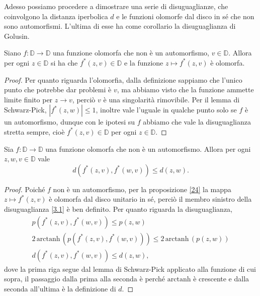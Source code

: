 Adesso possiamo procedere a dimostrare una serie di disuguaglianze, che coinvolgono la distanza iperbolica $d$ e le funzioni olomorfe dal disco in sé che non sono automorfismi. L'ultima di esse ha come corollario la disuguaglianza di Golusin.

\begin{prop} \label{24}
  Siano $f:\mathbb{D} \longrightarrow \mathbb{D}$ una funzione olomorfa che non è un automorfismo, $v \in \mathbb{D}$. Allora per ogni $z \in \mathbb{D}$ si ha che $f^*(z,v) \in \mathbb{D}$ e la funzione $z \longmapsto f^*(z,v)$ è olomorfa.
\end{prop}

\begin{proof}
  Per quanto riguarda l'olomorfia, dalla definizione sappiamo che l'unico punto che potrebbe dar problemi è $v$, ma abbiamo visto che la funzione ammette limite finito per $z \longrightarrow v$, perciò $v$ è una singolarità rimovibile. Per il lemma di Schwarz-Pick, $|f^*(z,w)| \le 1$, inoltre vale l'uguale in qualche punto solo se $f$ è un automorfismo, dunque con le ipotesi su $f$ abbiamo che vale la disuguaglianza stretta sempre, cioè $f^*(z,v) \in \mathbb{D}$ per ogni $z \in \mathbb{D}$.
\end{proof}

\begin{thm} \label{31}
  Sia $f:\mathbb{D} \longrightarrow \mathbb{D}$ una funzione olomorfa che non è un automorfismo. Allora per ogni $z, w, v \in \mathbb{D}$ vale
  \begin{equation} \label{3.1}
    d(f^*(z,v),f^*(w,v)) \le d(z,w).
  \end{equation}
\end{thm}

\begin{proof}
  Poiché $f$ non è un automorfismo, per la proposizione \ref{24} la mappa $z \longmapsto f^*(z,v)$ è olomorfa dal disco unitario in sé, perciò il membro sinistro della disuguaglianza \eqref{3.1} è ben definito. Per quanto riguarda la disuguaglianza,
  \begin{align*}
    p(f^*(z,v), f^*(w,v)) \le p(z,w) \\
    2\,\text{arctanh}\,(p(f^*(z,v), f^*(w,v))) \le 2\,\text{arctanh}\,(p(z,w)) \\
    d(f^*(z,v), f^*(w,v)) \le d(z,w),
  \end{align*}
  dove la prima riga segue dal lemma di Schwarz-Pick applicato alla funzione di cui sopra, il passaggio dalla prima alla seconda è perché $\text{arctanh}$ è crescente e dalla seconda all'ultima è la definizione di $d$.
\end{proof}

